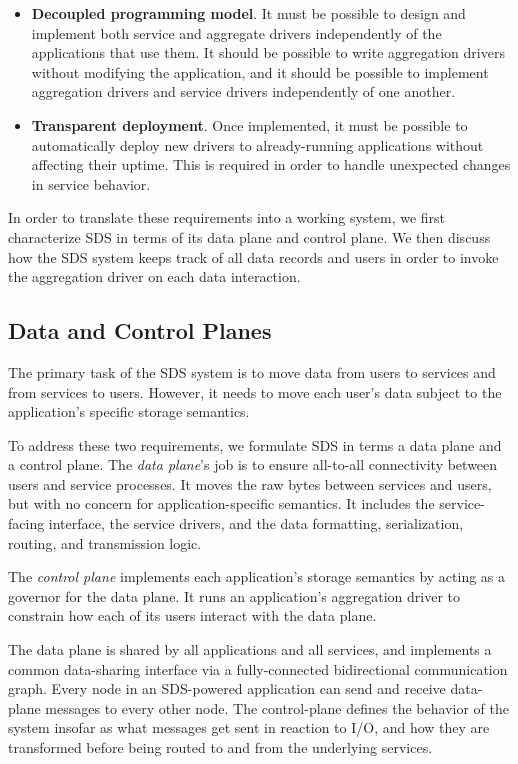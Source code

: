 \begin{itemize}
   \item \textbf{Decoupled programming model}.  It must be possible to design
      and implement both service and aggregate drivers independently of the
      applications that use them.  It should be possible to write
      aggregation drivers without modifying the application, and it should be
      possible to implement aggregation drivers and service drivers
      independently of one another.
   \item \textbf{Transparent deployment}.  Once implemented, it must be possible
      to automatically deploy new drivers to already-running applications
      without affecting their uptime.  This is required in order to handle
      unexpected changes in service behavior.
\end{itemize}

In order to translate these requirements into a working system, we first
characterize SDS in terms of its data plane and control plane.  We then discuss
how the SDS system keeps track of all data records and users in order to invoke
the aggregation driver on each data interaction.

\subsection{Data and Control Planes}

The primary task of the SDS system is to move data from users to services and from
services to users.  However, it needs to move each user's data
subject to the application's specific storage semantics.

To address these two requirements, we formulate SDS in terms a
data plane and a control plane.  The \emph{data plane}'s job
is to ensure all-to-all connectivity between users and service processes.
It moves the raw bytes between services and users, but with no concern for
application-specific semantics.  It includes the service-facing interface, the
service drivers, and the data formatting, serialization, routing, and transmission
logic.

The \emph{control plane} implements each application's
storage semantics by acting as a governor for the data plane.
It runs an application's aggregation driver 
to constrain how each of its users interact with the data plane.

The data plane is shared by all applications and all services, and implements a
common data-sharing interface via a fully-connected bidirectional communication graph.
Every node in an SDS-powered application can send and receive data-plane
messages to every other node.  The control-plane defines the behavior of the
system insofar as what messages get sent in reaction to I/O, and how they are
transformed before being routed to and from the underlying services.

